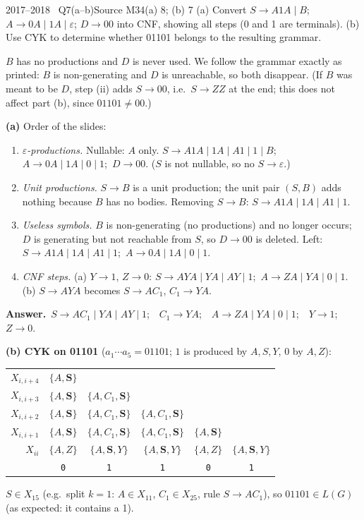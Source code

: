 \documentclass[11pt,a4paper]{article}
\newcommand{\eps}{\varepsilon}
\newcommand{\ans}[1]{\par\smallskip\noindent\colorbox{mist}{\parbox{\dimexpr\linewidth-2\fboxsep}{\sffamily\small\textbf{\color{teal}Answer.}\ \color{ink}#1}}\par}
\begin{document}
\begin{question}{2017--2018 \textbullet\ Q7(a--b)}{Source M34}{(a) 8; (b) 7}
(a) Convert $S\to A1A\mid B$; $A\to0A\mid1A\mid\eps$; $D\to00$ into CNF, showing all steps (0 and 1 are terminals). (b) Use CYK to determine whether 01101 belongs to the resulting grammar.
\end{question}
\begin{solution}
\begin{note}$B$ has no productions and $D$ is never used. We follow the grammar exactly as printed: $B$ is non-generating and $D$ is unreachable, so both disappear. (If $B$ was meant to be $D$, step (ii) adds $S\to00$, i.e.\ $S\to ZZ$ at the end; this does not affect part (b), since $01101\neq00$.)\end{note}
\textbf{(a)} Order of the slides:
\begin{enumerate}[label=(\roman*)]
\item \emph{$\eps$-productions.} Nullable: $A$ only. $S\to A1A\mid1A\mid A1\mid1\mid B$;\ $A\to0A\mid1A\mid0\mid1$;\ $D\to00$. ($S$ is not nullable, so no $S\to\eps$.)
\item \emph{Unit productions.} $S\to B$ is a unit production; the unit pair $(S,B)$ adds nothing because $B$ has no bodies. Removing $S\to B$: $S\to A1A\mid1A\mid A1\mid1$.
\item \emph{Useless symbols.} $B$ is non-generating (no productions) and no longer occurs; $D$ is generating but not reachable from $S$, so $D\to00$ is deleted. Left: $S\to A1A\mid1A\mid A1\mid1$;\ $A\to0A\mid1A\mid0\mid1$.
\item \emph{CNF steps.} (a) $Y\to1$, $Z\to0$: $S\to AYA\mid YA\mid AY\mid1$;\ $A\to ZA\mid YA\mid0\mid1$. (b) $S\to AYA$ becomes $S\to AC_1$, $C_1\to YA$.
\end{enumerate}
\ans{$S\to AC_1\mid YA\mid AY\mid1$;\ \ $C_1\to YA$;\ \ $A\to ZA\mid YA\mid0\mid1$;\ \ $Y\to1$;\ \ $Z\to0$.}
\textbf{(b) CYK on 01101} ($a_1\cdots a_5=01101$; $1$ is produced by $A,S,Y$, $0$ by $A,Z$):
\begin{center}\small\renewcommand{\arraystretch}{1.25}\begin{tabular}{r|ccccc}\toprule
$X_{i,i+4}$ & $\{A,\mathbf{S}\}$ &  &  &  & \\
$X_{i,i+3}$ & $\{A,\mathbf{S}\}$ & $\{A,C_1,\mathbf{S}\}$ &  &  & \\
$X_{i,i+2}$ & $\{A,\mathbf{S}\}$ & $\{A,C_1,\mathbf{S}\}$ & $\{A,C_1,\mathbf{S}\}$ &  & \\
$X_{i,i+1}$ & $\{A,\mathbf{S}\}$ & $\{A,C_1,\mathbf{S}\}$ & $\{A,C_1,\mathbf{S}\}$ & $\{A,\mathbf{S}\}$ & \\
$X_{ii}$ & $\{A,Z\}$ & $\{A,\mathbf{S},Y\}$ & $\{A,\mathbf{S},Y\}$ & $\{A,Z\}$ & $\{A,\mathbf{S},Y\}$\\
\midrule & \texttt{0} & \texttt{1} & \texttt{1} & \texttt{0} & \texttt{1}\\\bottomrule\end{tabular}\end{center}
$S\in X_{15}$ (e.g.\ split $k=1$: $A\in X_{11}$, $C_1\in X_{25}$, rule $S\to AC_1$), so \textbf{$01101\in L(G)$} (as expected: it contains a 1).
\end{solution}
\end{document}
